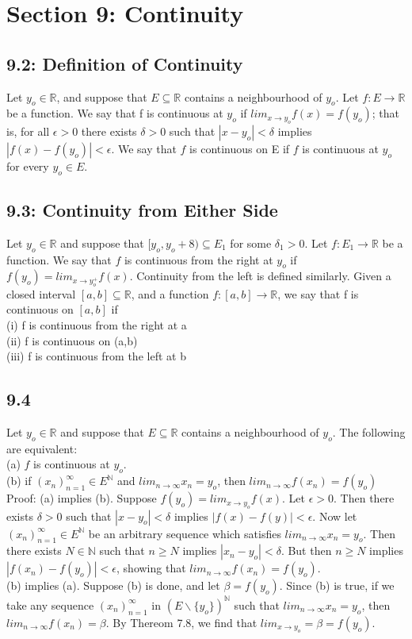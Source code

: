 \documentclass[10pt,letter]{report}
\begin{document}
\chapter*{Section 9: Continuity}

\section*{9.2: Definition of Continuity}
Let $y_o\in\mathbb{R}$, and suppose that $E\subseteq\mathbb{R}$ contains a neighbourhood of $y_o$. Let $f: E\rightarrow\mathbb{R}$ be a function. We say that f is continuous at $y_o$ if $lim_{x\rightarrow y_o}f(x) = f(y_o)$; that is, for all $\epsilon>0$ there exists $\delta>0$ such that $|x-y_o|<\delta$ implies $|f(x)-f(y_o)|<\epsilon$. We say that $f$ is continuous on E if $f$ is continuous at $y_o$ for every $y_o\in E$. 

\section*{9.3: Continuity from Either Side}
Let $y_o\in\mathbb{R}$ and suppose that $[y_o,y_o+8)\subseteq E_1$ for some $\delta_1>0$. Let $f: E_1\rightarrow\mathbb{R}$ be a function. We say that $f$ is continuous from the right at $y_o$ if $f(y_o) = lim_{x\rightarrow y_o^+}f(x)$. Continuity from the left is defined similarly. Given a closed interval $[a,b]\subseteq\mathbb{R}$, and a function $f:[a,b]\rightarrow\mathbb{R}$, we say that f is continuous on $[a,b]$ if \\ 
(i) f is continuous from the right at a\\ 
(ii) f is continuous on (a,b) \\ 
(iii) f is continuous from the left at b\\

\section*{9.4}
Let $y_o\in\mathbb{R}$ and suppose that $E\subseteq\mathbb{R}$ contains a neighbourhood of $y_o$. The following are equivalent: \\ 
(a) $f$ is continuous at $y_o$. \\ 
(b) if $(x_n)_{n=1}^\infty\in E^\mathbb{N}$ and $lim_{n\rightarrow\infty}x_n=y_o$, then $lim_{n\rightarrow\infty}f(x_n)=f(y_o)$ \\ 
Proof: (a) implies (b). Suppose $f(y_o) = lim_{x\rightarrow y_o}f(x)$. Let $\epsilon>0$. Then there exists $\delta>0$ such that $|x-y_o|<\delta$ implies $|f(x)-f(y)|<\epsilon$. Now let $(x_n)_{n=1}^\infty\in E^\mathbb{N}$ be an arbitrary sequence which satisfies $lim_{n\rightarrow\infty}x_n=y_o$. Then there exists $N\in\mathbb{N}$ such that $n\geq N$ implies $|x_n-y_o|<\delta$. But then $n\geq N$ implies $|f(x_n)-f(y_o)|<\epsilon$, showing that $lim_{n\rightarrow\infty}f(x_n) = f(y_o)$. \\ 
(b) implies (a). Suppose (b) is done, and let $\beta=f(y_o)$. Since (b) is true, if we take any sequence $(x_n)_{n=1}^\infty$ in $(E\backslash\{y_o\})^\mathbb{N}$ such that $lim_{n\rightarrow\infty}x_n = y_o$, then $lim_{n\rightarrow\infty}f(x_n)  = \beta$. By Thereom 7.8, we find that $lim_{x\rightarrow y_o}=\beta = f(y_o)$. 
\end{document}
